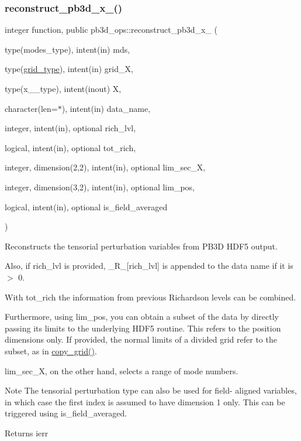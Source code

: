 \subsubsection{\texorpdfstring{reconstruct\+\_\+pb3d\+\_\+x\+\_()}{reconstruct\_pb3d\_x\_2()}}
{\footnotesize\ttfamily integer function, public pb3d\+\_\+ops\+::reconstruct\+\_\+pb3d\+\_\+x\+\_ (\begin{DoxyParamCaption}\item[{type(modes\+\_\+type), intent(in)}]{mds,  }\item[{type(\hyperlink{structgrid__vars_1_1grid__type}{grid\+\_\+type}), intent(in)}]{grid\+\_\+X,  }\item[{type(x\+\_\+2\+\_\+type), intent(inout)}]{X,  }\item[{character(len=$\ast$), intent(in)}]{data\+\_\+name,  }\item[{integer, intent(in), optional}]{rich\+\_\+lvl,  }\item[{logical, intent(in), optional}]{tot\+\_\+rich,  }\item[{integer, dimension(2,2), intent(in), optional}]{lim\+\_\+sec\+\_\+X,  }\item[{integer, dimension(3,2), intent(in), optional}]{lim\+\_\+pos,  }\item[{logical, intent(in), optional}]{is\+\_\+field\+\_\+averaged }\end{DoxyParamCaption})}



Reconstructs the tensorial perturbation variables from P\+B3D H\+D\+F5 output. 

Also, if {\ttfamily rich\+\_\+lvl} is provided, {\ttfamily \+\_\+\+R\+\_\+\mbox{[}rich\+\_\+lvl\mbox{]}} is appended to the data name if it is $>$ 0.

With {\ttfamily tot\+\_\+rich} the information from previous Richardson levels can be combined.

Furthermore, using {\ttfamily lim\+\_\+pos}, you can obtain a subset of the data by directly passing its limits to the underlying H\+D\+F5 routine. This refers to the position dimensions only. If provided, the normal limits of a divided grid refer to the subset, as in \hyperlink{namespacegrid__utilities_a04f971c38083f873a04eb6568bed466b}{copy\+\_\+grid()}.

{\ttfamily lim\+\_\+sec\+\_\+X}, on the other hand, selects a range of mode numbers.

\begin{DoxyNote}{Note}
The tensorial perturbation type can also be used for field-\/ aligned variables, in which case the first index is assumed to have dimension 1 only. This can be triggered using {\ttfamily is\+\_\+field\+\_\+averaged}.
\end{DoxyNote}
\begin{DoxyReturn}{Returns}
ierr
\end{DoxyReturn}

